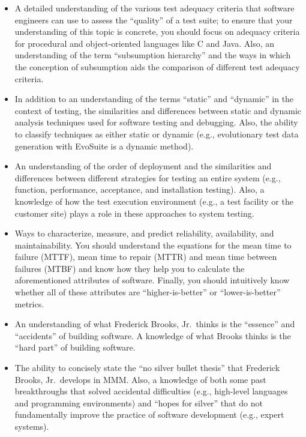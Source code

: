 \begin{itemize}
  \item A detailed understanding of the various test adequacy criteria that software engineers can use to assess the
    ``quality'' of a test suite; to ensure that your understanding of this topic is concrete, you should focus on
    adequacy criteria for procedural and object-oriented languages like C and Java. Also, an understanding of the term
    ``subsumption hierarchy'' and the ways in which the conception of subsumption aids the comparison of different test
    adequacy criteria.

  \item In addition to an understanding of the terms ``static'' and ``dynamic'' in the context of testing, the
    similarities and differences between static and dynamic analysis techniques used for software testing and debugging.
    Also, the ability to classify techniques as either static or dynamic (e.g., evolutionary test data generation with
    EvoSuite is a dynamic method).

  \item An understanding of the order of deployment and the similarities and differences between different strategies
    for testing an entire system (e.g., function, performance, acceptance, and installation testing). Also, a knowledge
    of how the test execution environment (e.g., a test facility or the customer site) plays a role in these approaches
    to system testing.

  \item Ways to characterize, measure, and predict reliability, availability, and maintainability. You should understand
    the equations for the mean time to failure (MTTF), mean time to repair (MTTR) and mean time between failures (MTBF)
    and know how they help you to calculate the aforementioned attributes of software. Finally, you should intuitively
    know whether all of these attributes are ``higher-is-better'' or ``lower-is-better'' metrics.

  \item An understanding of what Frederick Brooks, Jr.\ thinks is the ``essence'' and ``accidents'' of building
    software. A knowledge of what Brooks thinks is the ``hard part'' of building software.

  \item The ability to concisely state the ``no silver bullet thesis'' that Frederick Brooks, Jr.\ develops in MMM.
    Also, a knowledge of both some past breakthroughs that solved accidental difficulties (e.g., high-level languages
    and programming environments) and ``hopes for silver'' that do not fundamentally improve the practice of software
    development (e.g., expert systems).


\end{itemize}
